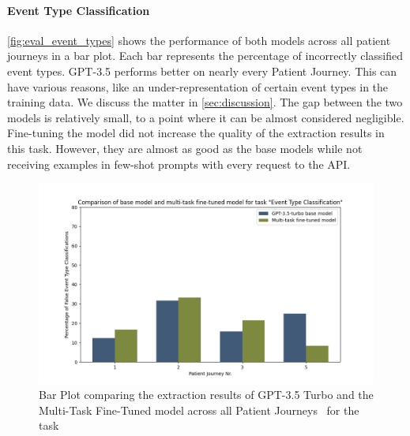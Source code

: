 \paragraph{Event Type Classification} \autoref{fig:eval_event_types} shows the performance of both models across all patient journeys in a bar plot. Each bar represents the percentage of incorrectly classified event types. GPT-3.5 performs better on nearly every Patient Journey. This can have various reasons, like an under-representation of certain event types in the training data. We discuss the matter in \autoref{sec:discussion}. The gap between the two models is relatively small, to a point where it can be almost considered negligible. Fine-tuning the model did not increase the quality of the extraction results in this task. However, they are almost as good as the base models while not receiving examples in few-shot prompts with every request to the API. 
\begin{figure}
    \centering
    \includegraphics[width=\textwidth]{bachelor_thesis/images/event_types_all.png}
    \caption{Bar Plot comparing the extraction results of GPT-3.5 Turbo and the Multi-Task Fine-Tuned model across all Patient Journeys~ for the task }
    \label{fig:eval_event_types}
\end{figure}

